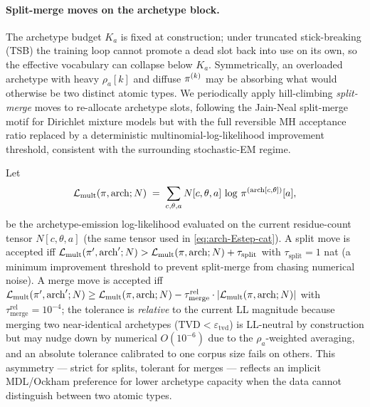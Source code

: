 \paragraph{Split-merge moves on the archetype block.}
\label{par:arch-split-merge}
The archetype budget $K_a$ is fixed at construction; under truncated
stick-breaking (TSB) the training loop cannot promote a dead slot back
into use on its own, so the effective vocabulary can collapse below
$K_a$. Symmetrically, an overloaded archetype with heavy $\rho_a[k]$
and diffuse $\pi^{(k)}$ may be absorbing what would otherwise be two
distinct atomic types. We periodically apply hill-climbing
\emph{split-merge} moves to re-allocate archetype slots, following the
Jain-Neal split-merge motif for Dirichlet mixture models
\citep{jainneal2004} but with the full reversible MH acceptance ratio
replaced by a deterministic multinomial-log-likelihood improvement
threshold, consistent with the surrounding stochastic-EM regime.

Let
\[
  \mathcal{L}_{\text{mult}}(\pi, \mathrm{arch}; N) \;=\;
  \sum_{c, \theta, a} N[c, \theta, a] \,\log\,\pi^{(\mathrm{arch}[c, \theta])}[a],
  \label{eq:arch-sm-obj}
\]
be the archetype-emission log-likelihood evaluated on the current
residue-count tensor $N[c, \theta, a]$ (the same tensor used in
\eqref{eq:arch-Estep-cat}). A split move is accepted iff
$\mathcal{L}_{\text{mult}}(\pi', \mathrm{arch}'; N) >
\mathcal{L}_{\text{mult}}(\pi, \mathrm{arch}; N) + \tau_{\text{split}}$
with $\tau_{\text{split}} = 1$ nat (a minimum improvement threshold to
prevent split-merge from chasing numerical noise). A merge move is
accepted iff
$\mathcal{L}_{\text{mult}}(\pi', \mathrm{arch}'; N) \geq
\mathcal{L}_{\text{mult}}(\pi, \mathrm{arch}; N) -
\tau_{\text{merge}}^{\text{rel}} \cdot |\mathcal{L}_{\text{mult}}(\pi, \mathrm{arch}; N)|$
with $\tau_{\text{merge}}^{\text{rel}} = 10^{-4}$; the tolerance is
\emph{relative} to the current LL magnitude because merging two
near-identical archetypes ($\text{TVD} < \varepsilon_{\text{tvd}}$) is
LL-neutral by construction but may nudge down by numerical
$O(10^{-6})$ due to the $\rho_a$-weighted averaging, and an absolute
tolerance calibrated to one corpus size fails on others. This
asymmetry --- strict for splits, tolerant for merges --- reflects an
implicit MDL/Ockham preference for lower archetype capacity when
the data cannot distinguish between two atomic types.

